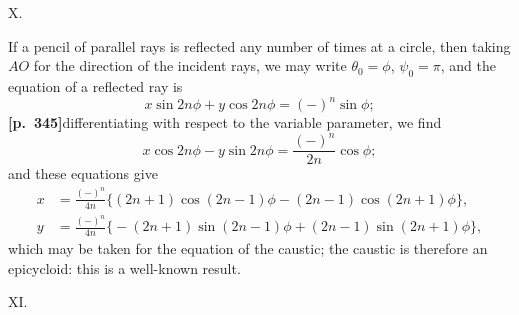 \documentclass[11pt]{article}
\begin{document}
\begin{center}
\end{center}

\medskip
\begin{center}X.\end{center}

If a pencil of parallel rays is reflected any number of times at a circle, then taking $AO$ for the direction of the incident rays, we may write $\theta_{0} = \phi$, $\psi_{0} = \pi$, and the equation of a reflected ray is
\[
x\sin 2n\phi + y\cos 2n\phi = (-)^{n}\sin\phi;
\]
\textbf{[p.~345]}\quad differentiating with respect to the variable parameter, we find
\[
x\cos 2n\phi - y\sin 2n\phi = \frac{(-)^{n}}{2n}\cos\phi;
\]
and these equations give
\begin{align*}
x &= \frac{(-)^{n}}{4n}\bigl\{(2n+1)\cos(2n-1)\phi - (2n-1)\cos(2n+1)\phi\bigr\},\\
y &= \frac{(-)^{n}}{4n}\bigl\{-(2n+1)\sin(2n-1)\phi + (2n-1)\sin(2n+1)\phi\bigr\},
\end{align*}
which may be taken for the equation of the caustic; the caustic is therefore an epicycloid: this is a well-known result.

\medskip
\begin{center}XI.\end{center}
\end{document}
